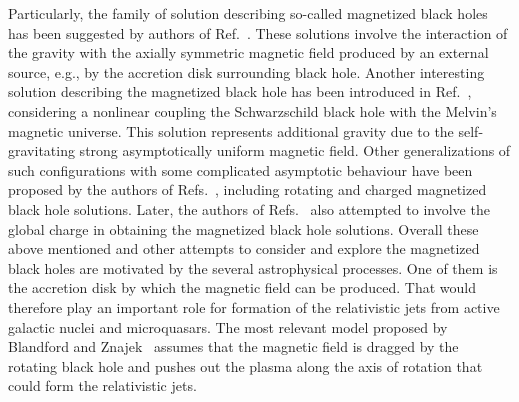 \documentclass[showpacs,twocolumn,superscriptaddress]{revtex4}
\begin{document}
Particularly, the family of solution describing so-called magnetized black holes has been suggested by authors of Ref.~\cite{Aliev89}. These solutions involve the interaction of the gravity with the axially symmetric magnetic field produced by an external source, e.g., by the accretion disk surrounding black hole. Another interesting solution describing the magnetized black hole has been introduced in Ref.~\cite{Ernst76}, considering a nonlinear coupling the Schwarzschild black hole with the Melvin’s magnetic universe. This solution represents additional gravity due to the self-gravitating strong asymptotically uniform magnetic field. Other generalizations of such configurations with some complicated asymptotic behaviour have been proposed by the authors of Refs.~\cite{Ernst76wz, Aliev89wz,Garcia85wz}, including rotating and charged magnetized black hole solutions. Later, the authors of Refs.~\cite{Gibbons14wz, Astorino16wz} also attempted to involve the global charge in obtaining the magnetized black hole solutions. 
Overall these above mentioned and other attempts to consider and explore the magnetized black holes are motivated by the several astrophysical processes. One of them is the accretion disk by which the magnetic field can be produced. That would therefore play an important role for formation of the relativistic jets from active galactic nuclei and microquasars. The most relevant model proposed by Blandford and Znajek~\cite{Blandford1977} assumes that the magnetic field is dragged by the rotating black hole and pushes out the plasma along the axis of rotation that could form the relativistic jets.   
\end{document}
